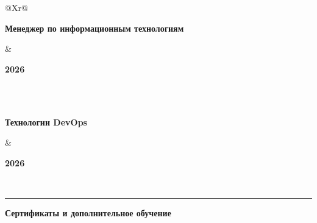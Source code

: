 \documentclass[a4paper,10pt]{article}
\newcommand{\fontEducationGroup}{%
    \fontsize{11.4}{13.2}\selectfont
}
\newcommand{\fontEducationDate}{%
    \fontsize{10}{11.6}\selectfont
}
\newcommand{\spaceEducationSeparator}{6.5pt}
\newcommand{\educationGroup}[1]{%
    {%
        \fontEducationGroup
        \bfseries
        \color{accent}
        #1\par
    }%
    \vspace{4pt}%
}
\newcommand{\educationSeparator}{%
    \par
    \vspace{\spaceEducationSeparator}%
    {%
        \color{lightgray}
        \noindent
        \rule{\textwidth}{0.5pt}\par
    }%
    \vspace{\spaceEducationSeparator}%
}
\begin{document}
\begin{tabularx}{\textwidth}{@{}Xr@{}}

    {%
        \fontsize{10}{11.4}\selectfont
        \bfseries
        Менеджер по информационным технологиям
    }

    &

    {%
        \fontEducationDate
        \bfseries
        2026
    }

    \\[1pt]


    \\[5pt]

    {%
        \fontsize{10}{11.4}\selectfont
        \bfseries
        Технологии DevOps
    }

    &

    {%
        \fontEducationDate
        \bfseries
        2026
    }

    \\[1pt]


\end{tabularx}

\educationSeparator

\educationGroup{Сертификаты и дополнительное обучение}
\end{document}
